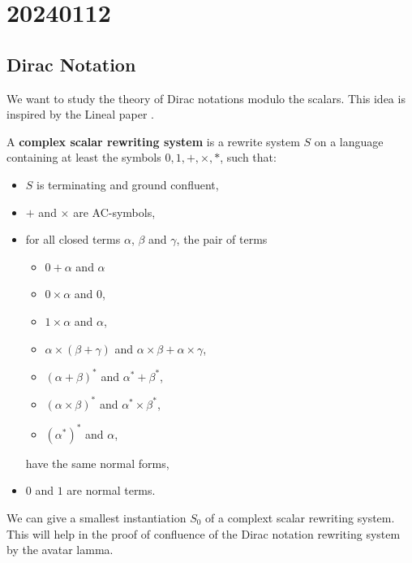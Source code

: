 \chapter{20240112}

\newcommand*{\unit}{\texttt{unit}}
\newcommand*{\utt}{\texttt{tt}}
\newcommand*{\fst}{\texttt{fst}}
\newcommand*{\snd}{\texttt{snd}}
\newcommand*{\reduce}{\ \triangleright\ }

\section{Dirac Notation}

We want to study the theory of Dirac notations modulo the scalars. This idea is inspired by the Lineal paper \cite{Arrighi2017}.

\begin{definition}
  A \textbf{complex scalar rewriting system} is a rewrite system $S$ on a language containing at least the symbols $0, 1, +, \times, *$, such that:
  \begin{itemize}
    \item $S$ is terminating and ground confluent,
    \item $+$ and $\times$ are AC-symbols,
    \item for all closed terms $\alpha$, $\beta$ and $\gamma$, the pair of terms
      \begin{itemize}
        \item $0 + \alpha$ and $\alpha$
        \item $0 \times \alpha$ and $0$,
        \item $1 \times \alpha$ and $\alpha$,
        \item $\alpha \times (\beta + \gamma)$ and $\alpha \times \beta + \alpha \times \gamma$,
        \item $(\alpha + \beta)^*$ and $\alpha^* + \beta^*$,
        \item $(\alpha \times \beta)^*$ and $\alpha^* \times \beta^*$,
        \item $(\alpha^*)^*$ and $\alpha$,
      \end{itemize}
      have the same normal forms,
    \item $0$ and $1$ are normal terms.
  \end{itemize}
\end{definition}

We can give a smallest instantiation $S_0$ of a complext scalar rewriting system. This will help in the proof of confluence of the Dirac notation rewriting system by the avatar lamma.

